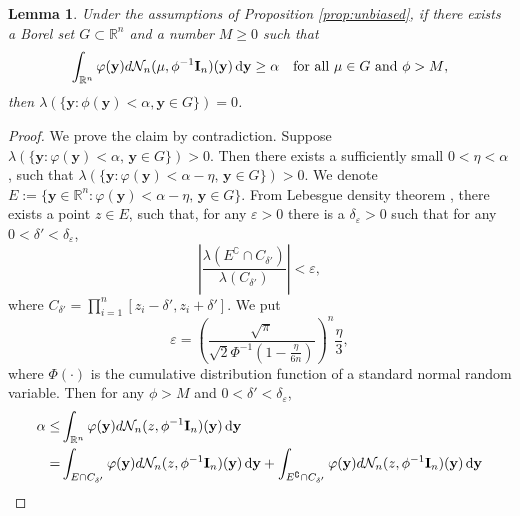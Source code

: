 \documentclass[11pt]{article}
\newcommand{\By}{\mathbf{y}}    \newcommand{\Bz}{\mathbf{z}}
\theoremstyle{plain}
\newtheorem{lemma}{\quad\quad Lemma}
\theoremstyle{definition}
\theoremstyle{remark}
\begin{document}
\begin{lemma}\label{Lemma:FF}
    Under the assumptions of Proposition \ref{prop:unbiased}, if there exists a Borel set $G\subset \mathbb R^n$ and a number $M\geq 0$ such that 
    \begin{equation*}
        \int_{\mathbb R^n} \varphi(\By) d\mathcal N_n(\mu,\phi^{-1} \BI_n)(\By)\, \mathrm{d} \By \geq \alpha\quad \text{for all $\mu \in G$ and $\phi >M$},
    \end{equation*}
    then $\lambda(\{\By : \phi(\By)< \alpha, \By \in G\})=0$.
\end{lemma}
\begin{proof}
    We prove the claim by contradiction.
    Suppose $\lambda(\{\By:\varphi (\By) <\alpha,\, \By \in G\})>0$.
    Then there exists a sufficiently small $0< \eta <\alpha$, such that $\lambda(\{\By:\varphi (\By) <\alpha-\eta,\, \By \in G\})>0$.
    We denote $ E:=\{\By\in \mathbb R^n:\varphi (\By) <\alpha-\eta,\,  \By \in G\}$.
    From Lebesgue density theorem \citep[Corollary 6.2.6]{book:992991}, there exists a point $z\in  E$, such that, for any $\varepsilon >0$ there is a $\delta_{\varepsilon}>0$ such that for any $0 < \delta' <\delta_\varepsilon$,
    \begin{equation*}
        \left|\frac{\lambda(E^\complement\cap C_{\delta'})}{\lambda(C_{\delta'})}\right|<\varepsilon,
    \end{equation*}
    where $C_{\delta'}=\prod_{i=1}^n [z_i-{\delta'}, z_i + {\delta'}]$.
    We put
    \begin{equation*}
        \varepsilon=\left(\frac{\sqrt \pi}{\sqrt 2 \Phi^{-1}\left(1-\frac{\eta}{6n}\right)}\right)^n \frac{\eta}{3},
    \end{equation*}
    where $\Phi(\cdot)$ is the cumulative distribution function of a standard normal random variable.
    Then for any $\phi>M$ and $0<\delta' <\delta_\varepsilon$,
    \begin{equation*}
        \begin{split}
            \alpha \leq& 
            \int_{\mathbb R^n}\varphi(\By) d\mathcal N_n (z, \phi^{-1} \BI_n) (\By)\,\mathrm{d} \By
            \\
            =&
            \int_{E\cap C_{\delta'}}\varphi(\By) d\mathcal N_n (z, \phi^{-1} \BI_n) (\By)\,\mathrm{d} \By
            +
            \int_{E^\complement\cap C_{\delta'}}\varphi(\By) d\mathcal N_n (z, \phi^{-1} \BI_n) (\By)\,\mathrm{d} \By
            \\

\end{split}
\end{equation*}
\end{proof}
\end{document}
